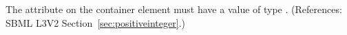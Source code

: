 The attribute  on the  container element
must have a value of type .  (References: SBML
L3V2 Section~\ref{sec:positiveinteger}.)
